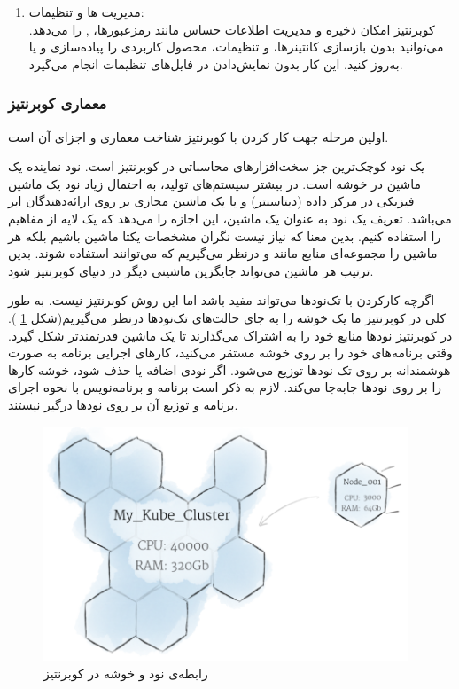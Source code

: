 \begin{enumerate}
	\item
	مدیریت 
	ها و تنظیمات:\\
	کوبرنتیز امکان ذخیره و مدیریت اطلاعات حساس مانند رمز‌عبورها، 
	, 
	را می‌دهد. می‌توانید بدون بازسازی کانتینرها، 
	و تنظیمات، محصول کاربردی را پیاده‌سازی و یا به‌روز کنید. این کار بدون نمایش‌دادن 
	در فایل‌های تنظیمات انجام می‌گیرد.
	
\end{enumerate}

\newpage

\subsubsection{معماری کوبرنتیز}
اولین مرحله جهت کار کردن با کوبرنتیز شناخت معماری و اجزای آن است.

یک نود کوچک‌ترین جز سخت‌افزارهای محاسباتی در کوبرنتیز است. نود نماینده یک ماشین در خوشه است. در بیشتر سیستم‌های تولید، به احتمال زیاد نود یک ماشین فیزیکی در مرکز داده (‌دیتاسنتر) و یا یک ماشین مجازی بر روی ارائه‌دهندگان ابر می‌باشد. تعریف یک نود به عنوان یک ماشین، ‌این اجازه را می‌دهد که یک لایه از مفاهیم را استفاده  کنیم. بدین معنا که نیاز نیست نگران مشخصات یکتا ماشین باشیم بلکه هر ماشین را مجموعه‌ای منابع مانند 
و
درنظر می‌گیریم که می‌توانند استفاده شوند. بدین ترتیب هر ماشین می‌تواند جایگزین ماشینی دیگر در دنیای کوبرنتیز شود.

اگرچه کارکردن با تک‌نودها می‌تواند مفید باشد اما این روش کوبرنتیز نیست. به طور کلی در کوبرنتیز ما یک خوشه را به جای حالت‌های تک‌نودها درنظر می‌گیریم(شکل
\ref{تصویر 2-9}
). در کوبرنتیز نودها منابع خود را به اشتراک می‌گذارند تا یک ماشین قدرتمند‌تر شکل گیرد. وقتی برنامه‌های خود را بر روی خوشه مستقر می‌کنید، کارهای اجرایی برنامه به صورت هوشمندانه بر روی تک نودها توزیع می‌شود. اگر نودی اضافه یا حذف شود، خوشه کارها را بر روی نودها  جابه‌جا می‌کند. لازم به ذکر است برنامه و برنامه‌نویس با نحوه اجرای برنامه و توزیع آن بر روی نودها درگیر نیستند.

\begin{figure}[!h]
	\centering
	\includegraphics[height=7cm]{fig2-9}
	\caption{رابطه‌ی نود و خوشه در کوبرنتیز}
	\label{تصویر 2-9}
\end{figure}

